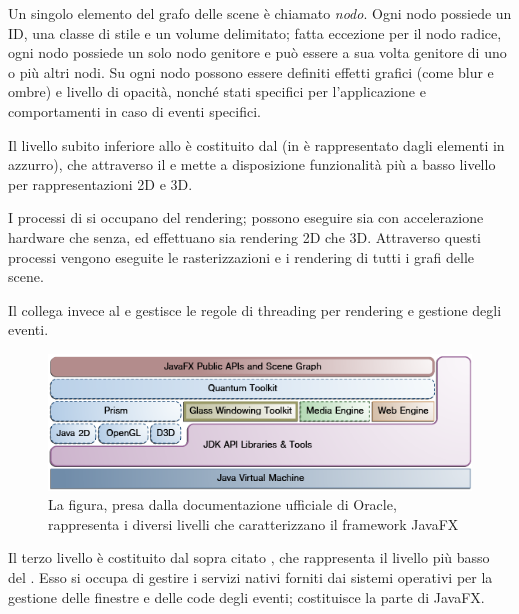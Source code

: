             Un singolo elemento del grafo delle scene è chiamato \emph{nodo}. Ogni nodo possiede un ID, una classe di stile e un volume delimitato; fatta eccezione per il nodo radice, ogni nodo possiede un solo nodo genitore e può essere a sua volta genitore di uno o più altri nodi. Su ogni nodo possono essere definiti effetti grafici (come blur e ombre) e livello di opacità, nonché stati specifici per l'applicazione e comportamenti in caso di eventi specifici.

            Il livello subito inferiore allo  è costituito dal  (in  è rappresentato dagli elementi in azzurro), che attraverso il  e  mette a disposizione funzionalità più a basso livello per rappresentazioni 2D e 3D.

            I processi di  si occupano del rendering; possono eseguire sia con accelerazione hardware che senza, ed effettuano sia rendering 2D che 3D.
            Attraverso questi processi vengono eseguite le rasterizzazioni e i rendering di tutti i grafi delle scene.

            Il  collega invece  al  e gestisce le regole di threading per rendering e gestione degli eventi.

            \begin{figure}[htbp]
                \centering
                \includegraphics[scale=0.75]{img/jfxArch}
                \caption[La figura, presa dalla documentazione ufficiale di Oracle, rappresenta i diversi livelli che caratterizzano il framework JavaFX]{La figura, presa dalla documentazione ufficiale di Oracle\protect\footnotemark, rappresenta i diversi livelli che caratterizzano il framework JavaFX}
                \label{fig:jfxArch}
            \end{figure}

            Il terzo livello è costituito dal sopra citato , che rappresenta il livello più basso del .
            Esso si occupa di gestire i servizi nativi forniti dai sistemi operativi per la gestione delle finestre e delle code degli eventi; costituisce la parte  di JavaFX.

